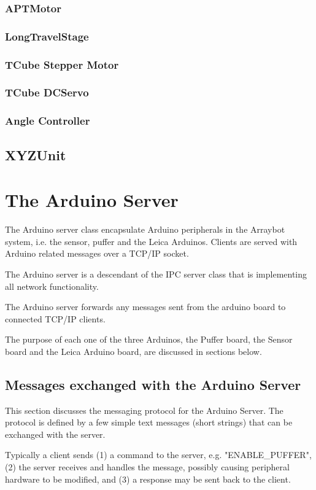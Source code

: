\documentclass[11pt,fleqn]{book} %
\begin{document}
\subsection{APTMotor}
\subsection{LongTravelStage}
\subsection{TCube Stepper Motor}
\subsection{TCube DCServo}
\subsection{Angle Controller}
\section{XYZUnit}

\chapter{The Arduino Server}
The Arduino server class encapsulate Arduino peripherals in the Arraybot system, i.e. the sensor, puffer and the Leica Arduinos. Clients are served with Arduino related messages over a
TCP/IP socket.  

The Arduino server is a descendant of the IPC server class that is implementing all
network functionality.

The Arduino server forwards any messages sent from the arduino board to connected TCP/IP clients.

The purpose of each one of the three Arduinos, the Puffer board, the Sensor board and the Leica Arduino board, are discussed in sections below.

\section{Messages exchanged with the Arduino Server}
This section discusses the messaging protocol for the Arduino Server. The protocol is defined by a few simple text messages (short strings) that can be exchanged with the server. 

Typically a client sends (1) a command to the server, e.g. "ENABLE\_PUFFER", (2) the server receives and handles the message, possibly causing peripheral hardware to be modified, and (3) a response may be sent back to the client. 
\end{document}
